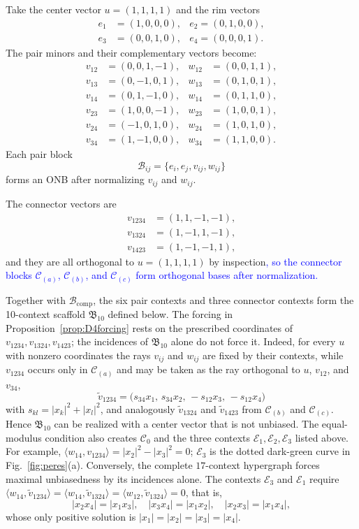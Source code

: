 \documentclass[%
  reprint,
  superscriptaddress,
  showkeys,
  amsmath,amssymb,
  aps,pra,
  longbibliography,
  floatfix,
  x11names
]{revtex4-2}
\DeclareRobustCommand{\chg}[1]{\textcolor{blue}{#1}}
\begin{document}
Take the center vector $u=(1,1,1,1)$ and the rim vectors
\begin{align*}
e_1&=(1,0,0,0),& e_2 =(0,1,0,0),\\
e_3&=(0,0,1,0),& e_4 =(0,0,0,1).
\end{align*}
The pair minors and their complementary vectors become:
\begin{align*}
v_{12}&=(0,0,1,-1), & w_{12}&=(0,0,1,1),\\
v_{13}&=(0,-1,0,1), & w_{13}&=(0,1,0,1),\\
v_{14}&=(0,1,-1,0), & w_{14}&=(0,1,1,0),\\
v_{23}&=(1,0,0,-1), & w_{23}&=(1,0,0,1),\\
v_{24}&=(-1,0,1,0), & w_{24}&=(1,0,1,0),\\
v_{34}&=(1,-1,0,0), & w_{34}&=(1,1,0,0).
\end{align*}
Each pair block
\[
\mathcal{B}_{ij}=\{e_i, e_j, v_{ij}, w_{ij}\}
\]
forms an ONB after normalizing $v_{ij}$ and $w_{ij}$.

The connector vectors are
\begin{align*}
v_{1234}&=(1,1,-1,-1),\\
v_{1324}& =(1,-1,1,-1),\\
v_{1423}&=(1,-1,-1,1),
\end{align*}
and they are all orthogonal to $u=(1,1,1,1)$ by inspection\chg{, so the connector blocks $\mathcal{C}_{(a)}$, $\mathcal{C}_{(b)}$, and $\mathcal{C}_{(c)}$ form orthogonal bases after normalization.}

Together with $\mathcal{B}_{\mathrm{comp}}$, the six pair contexts and three connector contexts form the 10-context scaffold {\color{blue}$\mathfrak{B}_{10}$ defined below.  The forcing in Proposition~\ref{prop:D4forcing} rests on the prescribed coordinates of $v_{1234},v_{1324},v_{1423}$; the incidences of $\mathfrak{B}_{10}$ alone do not force it.  Indeed, for every $u$ with nonzero coordinates the rays $v_{ij}$ and $w_{ij}$ are fixed by their contexts, while $v_{1234}$ occurs only in $\mathcal{C}_{(a)}$ and may be taken as the ray orthogonal to $u$, $v_{12}$, and $v_{34}$,
\[
\tilde v_{1234}=\bigl(s_{34}x_1,\,s_{34}x_2,\,-s_{12}x_3,\,-s_{12}x_4\bigr)
\]
with $s_{kl}=|x_k|^2+|x_l|^2$, and analogously $\tilde v_{1324}$ and $\tilde v_{1423}$ from $\mathcal{C}_{(b)}$ and $\mathcal{C}_{(c)}$.  Hence $\mathfrak{B}_{10}$ can be realized with a center vector that is not unbiased.}  The equal-modulus condition also creates $\mathcal{C}_0$ and the three contexts $\mathcal{E}_1,\mathcal{E}_2,\mathcal{E}_3$ listed above.  For example, $\langle w_{14},v_{1234}\rangle=|x_2|^2-|x_3|^2=0$; $\mathcal{E}_3$ is the dotted dark-green curve in Fig.~\ref{fig:peres}(a).  {\color{blue}Conversely, the complete $17$-context hypergraph forces maximal unbiasedness by its incidences alone.  The contexts $\mathcal{E}_3$ and $\mathcal{E}_1$ require $\langle w_{14},\tilde v_{1234}\rangle=\langle w_{14},\tilde v_{1324}\rangle=\langle w_{12},\tilde v_{1324}\rangle=0$, that is,
\[
|x_2x_4|=|x_1x_3|,\quad
|x_3x_4|=|x_1x_2|,\quad
|x_2x_3|=|x_1x_4|,
\]
whose only positive solution is $|x_1|=|x_2|=|x_3|=|x_4|$.}
\end{document}

